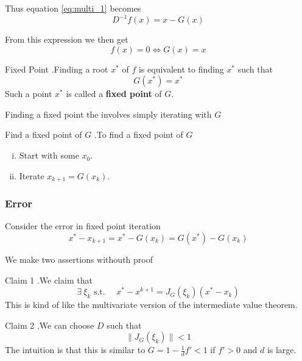 \documentclass[12pt,letterpaper]{article}
\begin{document}
Thus equation \ref{eq:multi_1} becomes
\begin{equation}
	D^{-1} f(x) = x - G(x)
\end{equation}

From this expression we then get
\begin{equation}
	f(x) = 0 \iff G(x) = x
\end{equation}


\begin{defn}{Fixed Point}
.Finding a root $x^*$ of $f$ is equivalent to finding $x^*$ such that
\begin{equation}
	G(x^*) = x^*
\end{equation}
Such a point $x^*$ is called a \textbf{fixed point} of $G$.
\end{defn}

Finding a fixed point the involves simply iterating with $G$
\begin{algo}{Find a fixed point of $G$}
.To find a fixed point of $G$
\begin{enumerate}[(i)]
	\item Start with some $x_0$.
	\item Iterate $x_{k+1} = G(x_k)$.
\end{enumerate}
\end{algo}

\subsubsection{Error}

Consider the error in fixed point iteration
\begin{equation}
	x^* - x_{k+1} = x^* - G(x_k) = G(x^*) - G(x_k)
\end{equation}

We make two assertions withouth proof
\begin{theo}{Claim 1}
.We claim that
\begin{equation}
	\exists\ \xi_k \text{ s.t. } \quad x^* - x^{k+1} = J_G(\xi_k)(x^* - x_k)
\end{equation}
This is kind of like the multivariate version of the intermediate value theorem.
\end{theo}

\begin{theo}{Claim 2}
.We can choose $D$ such that
\begin{equation}
	\lVert J_G(\xi_k) \rVert < 1
\end{equation}
The intuition is that this is similar to $G = 1 - \frac{1}{d} f' < 1$ if $f'>0$ and $d$ is large.
\end{theo}
\end{document}
